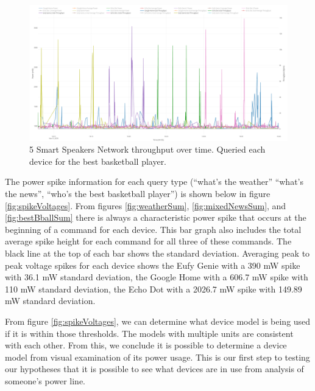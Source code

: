 \begin{figure}[H]
  \centering
  \includegraphics[width=1\textwidth]{figures/bestBballNetwork.png}
  \caption{5 Smart Speakers Network throughput over time. Queried each device for the best basketball player.}
  \label{fig:bestBballNetwork}
\end{figure}

The power spike information for each query type (``what's the weather'' ``what's the news'', ``who's the best basketball player'') is shown below in figure \ref{fig:spikeVoltages}. From figures \ref{fig:weatherSum}, \ref{fig:mixedNewsSum}, and \ref{fig:bestBballSum} there is always a characteristic power spike that occurs at the beginning of a command for each device. This bar graph also includes the total average spike height for each command for all three of these commands. The black line at the top of each bar shows the standard deviation. Averaging peak to peak voltage spikes for each device shows the Eufy Genie with a 390 mW spike with 36.1 mW standard deviation, the Google Home with a 606.7 mW spike with 110 mW standard deviation, the Echo Dot with a 2026.7 mW spike with 149.89 mW standard deviation.

From figure \ref{fig:spikeVoltages}, we can determine what device model is being used if it is within those thresholds. The models with multiple units are consistent with each other. From this, we conclude it is possible to determine a device model from visual examination of its power usage. This is our first step to testing our hypotheses that it is possible to see what devices are in use from analysis of someone's power line.

